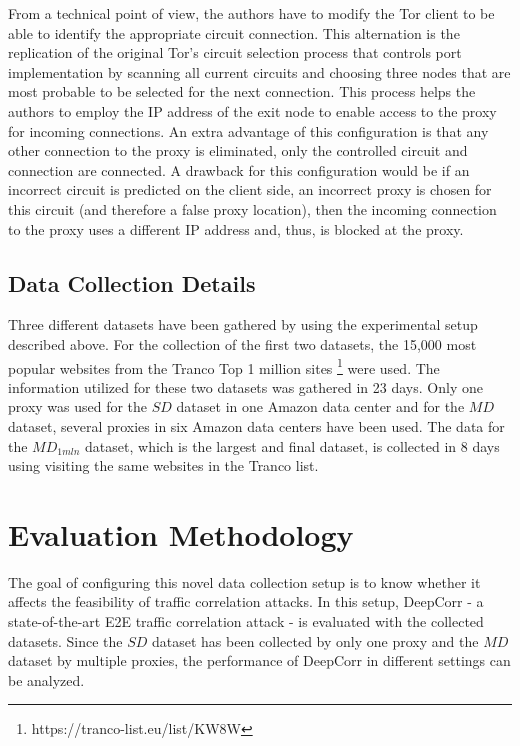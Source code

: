 \documentclass[sigconf]{acmart}
\begin{document}
From a technical point of view, the authors have to modify the Tor client to be able to identify the appropriate circuit connection. This alternation is the replication of the original Tor's circuit selection process that controls port implementation by scanning all current circuits and choosing three nodes that are most probable to be selected for the next connection. This process helps the authors to employ the IP address of the exit node to enable access to the proxy for incoming connections. An extra advantage of this configuration is that any other connection to the proxy is eliminated, only the controlled circuit and connection are connected. A drawback for this configuration would be if an incorrect circuit is predicted on the client side, an incorrect proxy is chosen for this circuit (and therefore a false proxy location), then the incoming connection to the proxy uses a different IP address and, thus, is blocked at the proxy.

\subsection{Data Collection Details} \label{5.3}

Three different datasets have been gathered by using the experimental setup described above. For the collection of the first two datasets, the 15,000 most popular websites from the Tranco Top 1 million sites \cite{pochat2018tranco}\footnote{https://tranco-list.eu/list/KW8W} were used. The information utilized for these two datasets was gathered in 23 days. Only one proxy was used for the $SD$ dataset in one Amazon data center and for the $MD$ dataset, several proxies in six Amazon data centers have been used. The data for the ${MD}$$_{1mln}$ dataset, which is the largest and final dataset, is collected in 8 days using visiting the same websites in the Tranco list. 


\section{Evaluation Methodology} \label{6}

The goal of configuring this novel data collection setup is to know whether it affects the feasibility of traffic correlation attacks. In this setup, DeepCorr \cite{nasr2018deepcorr} - a state-of-the-art E2E traffic correlation attack - is evaluated with the collected datasets. Since the $SD$ dataset has been collected by only one proxy and the $MD$ dataset by multiple proxies, the performance of DeepCorr in different settings can be analyzed.
\end{document}
